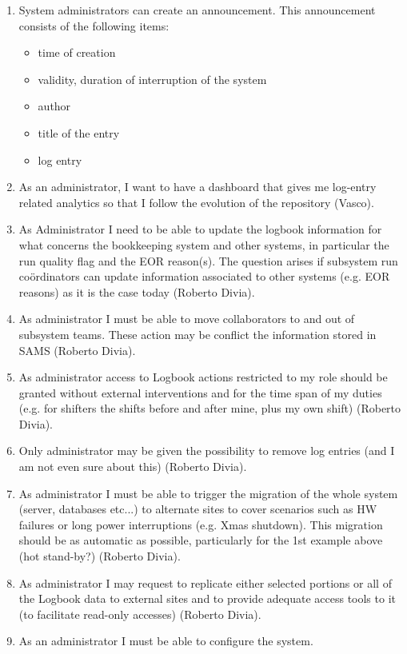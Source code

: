 \begin{enumerate}
  \item System administrators can create an announcement. This announcement consists of the following items:
  \begin{itemize}
    \item time of creation
    \item validity, duration of interruption of the system
    \item author
    \item title of the entry
    \item log entry
  \end{itemize}
  \item As an administrator, I want to have a dashboard that gives me log-entry related analytics so that I follow the evolution of the repository (Vasco). 
  \item As Administrator I need to be able to update the logbook information for what concerns the bookkeeping system and other systems, in particular the run quality flag and the EOR reason(s). The question arises if subsystem run co\"ordinators can update information associated to other systems (e.g. EOR reasons) as it is the case today (Roberto Divia).
  \item As administrator I must be able to move collaborators to and out of subsystem teams. These action may be conflict the information stored in SAMS (Roberto Divia).
    \item As administrator access to Logbook actions restricted to my role should be granted without external interventions and for the time span of my duties (e.g. for shifters the shifts before and after mine, plus my own shift) (Roberto Divia).
  \item Only administrator may be given the possibility to remove log entries (and I am not even sure about this) (Roberto Divia).
\item As administrator I must be able to trigger the migration of the whole system (server, databases etc...) to alternate sites to cover scenarios such as HW failures or long power interruptions (e.g. Xmas shutdown). This migration should be as automatic as possible, particularly for the 1st example above (hot stand-by?) (Roberto Divia).
  \item As administrator I may request to replicate either selected portions or all of the Logbook data to external sites and to provide adequate access tools to it (to facilitate read-only accesses) (Roberto Divia).
  \item As an administrator I must be able to configure the system.
\end{enumerate}






